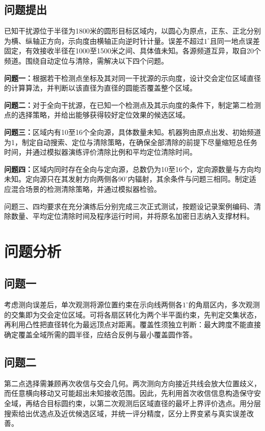 \documentclass{JXUSTmodeling}
\begin{document}
\subsection{问题提出}\label{sub:1.2}
已知干扰源位于半径为1800米的圆形目标区域内，以圆心为原点，正东、正北分别为横、纵轴正方向，示向度由横轴正向逆时针计量。误差不超过$1^\circ$且同一地点误差固定，有效接收半径在1000至1500米之间、具体值未知。各源频道互异，取自20个频道。围绕自动定位与清除，需解决以下四个问题。

\textbf{问题一：}根据若干检测点坐标及其对同一干扰源的示向度，设计交会定位区域直径的计算算法，并判断以该直径为直径的圆能否覆盖整个区域。

\textbf{问题二：}对于全向干扰源，在已知一个检测点及其示向度的条件下，制定第二检测点的选择策略，并给出能够获得较好定位效果的候选区域。

\textbf{问题三：}区域内有10至16个全向源，具体数量未知。机器狗由原点出发、初始频道为1，制定自动搜索、定位与清除策略，在确保全部清除的前提下尽量缩短总任务时间，并通过模拟器演练评价清除比例和平均定位清除时间。

\textbf{问题四：}区域内同时存在全向与定向源，总数仍为10至16个，定向源数量与方向均未知。定向源只在其发射方向两侧各$90^\circ$内辐射，其余条件与问题三相同。制定适应混合场景的检测清除策略，并通过模拟器检验。

问题三、四均要求在充分演练后分别完成三次正式测试，按题设记录案例编码、清除数量、平均定位清除时间及程序运行时间，并将原名加密日志纳入支撑材料。

\section{问题分析}\label{sec:2}
\subsection{问题一}\label{sub:2.1}
考虑测向误差后，单次观测将源位置约束在示向线两侧各$1^\circ$的角扇区内，多次观测的交集即为交会定位区域。可将各扇区转化为两个半平面约束，先判定交集状态，再利用凸性把直径转化为最远顶点对距离。覆盖性须独立判断：最大跨度不能直接确定覆盖全域所需的圆半径，应结合反例与最小覆盖圆作答。

\subsection{问题二}\label{sub:2.2}
第二点选择需兼顾再次收信与交会几何。两次测向方向接近共线会放大位置歧义，而任意横向移动又可能超出未知接收范围。因此，先利用首次收信信息构造保守安全域，再结合目标圆约束，以第二次观测后区域直径的最坏上界评价选点。用分层搜索给出优选点及近优候选区域，并统一评分精度，区分上界变紧与真实误差改善。
\end{document}
